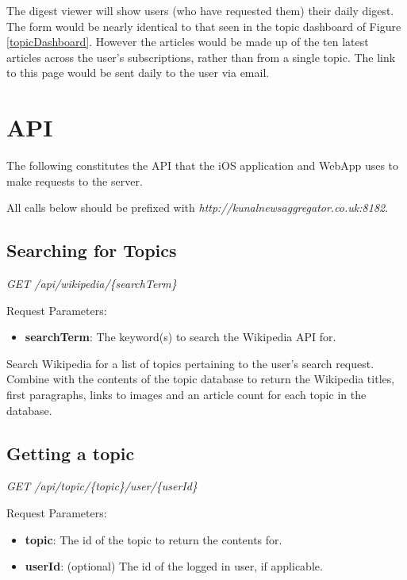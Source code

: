 \documentclass[12pt]{article}
\begin{document}
\begin{appendices}
The digest viewer will show users (who have requested them) their daily digest. The form would be nearly identical to that seen in the topic dashboard of Figure \ref{topicDashboard}. However the articles would be made up of the ten latest articles across the user's subscriptions, rather than from a single topic. The link to this page would be sent daily to the user via email.


\newpage

\section{API}

\label{WebAPI}

The following constitutes the API that the iOS application and WebApp uses to make requests to the server.

All calls below should be prefixed with \emph{http://kunalnewsaggregator.co.uk:8182}.

\subsection{Searching for Topics}

\emph{GET	/api/wikipedia/\{searchTerm\}}

Request Parameters:
\begin{itemize}
	\item \textbf{searchTerm}: The keyword(s) to search the Wikipedia API for.
\end{itemize}

Search Wikipedia for a list of topics pertaining to the user's search request. Combine with the contents of the topic database to return the Wikipedia titles, first paragraphs, links to images and an article count for each topic in the database.

\subsection{Getting a topic}

\emph{GET	/api/topic/\{topic\}/user/\{userId\}}

Request Parameters:
\begin{itemize}
	\item \textbf{topic}: The id of the topic to return the contents for.
	\item \textbf{userId}: (optional) The id of the logged in user, if applicable.
\end{itemize}


\end{appendices}
\end{document}
